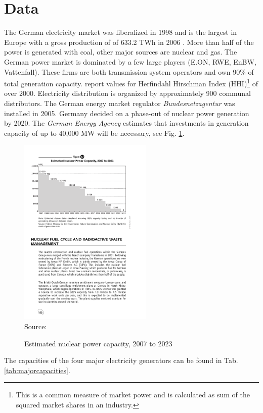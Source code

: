 \section{Data}

The German electricity market was liberalized in 1998 and is the largest in Europe with a gross production of of 633.2 TWh in 2006 \citep{IEA2007}. More than half of the power is generated with coal, other major sources are nuclear and gas. The German power market is dominated by a few large players (E.ON, RWE, EnBW, Vattenfall). These firms are both transmission system operators and own 90\% of total generation capacity. \cite{Brunekreeft2006} report values for Herfindahl Hirschman Index (HHI)\footnote{This is a common measure of market power and is calculated as sum of the squared market shares in an industry.} of over 2000. Electricity distribution is organized by approximately 900 communal distributors. The German energy market regulator  \emph{Bundesnetzagentur} was installed in 2005. Germany decided on a phase-out of nuclear power generation by 2020. The \emph{German Energy Agency} estimates that investments in generation capacity of up to 40,000 MW will be necessary, see Fig. \ref{fig:nuclear}.

\begin{figure}[htb]
  \centering
\caption{Estimated nuclear power capacity, 2007 to 2023}
\includegraphics[width=2.5in]{germandata/nuclear.pdf}
  \label{fig:nuclear}
\\
 \scriptsize Source: \cite{IEA2007a}
\end{figure}

The capacities of the four major electricity generators can be found in Tab. \ref{tab:majorcapacities}.

